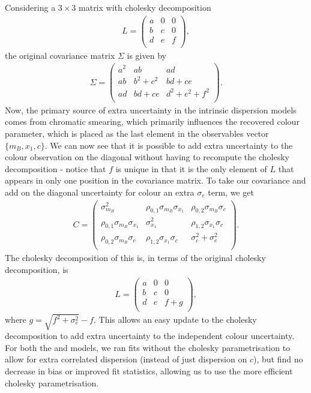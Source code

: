 \documentclass[a4paper,fleqn,usenatbib]{mnras}
\newcommand{\gten}{\citetalias{Guy2010}}
\newcommand{\celeven}{\citetalias{Chotard2011}}
\begin{document}
Considering a $3\times3$ matrix with cholesky decomposition
\begin{align}
L = \begin{pmatrix}
a & 0 & 0 \\ b & c & 0 \\ d & e & f \\
\end{pmatrix},
\end{align}
the original covariance matrix $\Sigma$ is given by
\begin{align}
\Sigma = \begin{pmatrix}
a^2 & ab & ad \\ ab & b^2 + c^2 & bd + ce \\ ad & bd + ce & d^2 + e^2 + f^2\\
\end{pmatrix}.
\end{align}
Now, the primary source of extra uncertainty in the intrinsic dispersion models comes from chromatic smearing, which primarily influences the recovered colour parameter, which is placed as the last element in the observables vector $\lbrace m_B, x_1, c\rbrace$. We can now see that it is possible to add extra uncertainty to the colour observation on the diagonal without having to recompute the cholesky decomposition - notice that $f$ is unique in that it is the only element of $L$ that appears in only one position in the covariance matrix. To take our covariance and add on the diagonal uncertainty for colour an extra $\sigma_e$ term, we get
\begin{align}
C = \begin{pmatrix}
\sigma_{m_B}^2 & \rho_{0,1} \sigma_{m_B} \sigma_{x_1} & \rho_{0,2} \sigma_{m_B} \sigma_c \\
\rho_{0,1} \sigma_{m_B} \sigma_{x_1} & \sigma_{x_1}^2 & \rho_{1, 2} \sigma_{x_1} \sigma_c \\
\rho_{0,2} \sigma_{m_B} \sigma_c & \rho_{1, 2} \sigma_{x_1} \sigma_c &  \sigma_c^2 + \sigma_e^2 \\
\end{pmatrix}.
\end{align}
The cholesky decomposition of this is, in terms of the original cholesky decomposition, is
\begin{align}
L = \begin{pmatrix}
a & 0 & 0 \\ b & c & 0 \\ d & e & f + g \\
\end{pmatrix},
\end{align}
where $g = \sqrt{f^2 + \sigma_e^2} - f$. This allows an easy update to the cholesky decomposition to add extra uncertainty to the independent colour uncertainty. For both the {\gten} and {\celeven} models, we ran fits without the cholesky parametrisation to allow for extra correlated dispersion (instead of just dispersion on $c$), but find no decrease in bias or improved fit statistics, allowing us to use the more efficient cholesky parametrisation.





\bsp	%
\label{lastpage}
\end{document}
